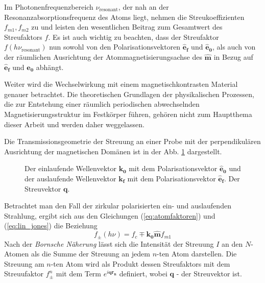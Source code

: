 \noindent
Im Photonenfrequenzbereich $\nu_\text{resonant}$, der nah an der Resonanzabsorptionsfrequenz des Atoms liegt, nehmen die Streukoeffizienten $f_{m1}, f_{m2}$ zu und leisten den wesentlichen Beitrag zum Gesamtwert des Streufaktors $f$. Es ist auch wichtig zu beachten, dass der Streufaktor $f(h\nu_\text{resonant})$ nun sowohl von den Polarisationsvektoren $\mathbf{\hat{e}_f}$ und $\mathbf{\hat{e}_0}$, als auch von der räumlichen Ausrichtung der Atommagnetisierungsachse des  $\mathbf{\hat{m}}$ in Bezug auf $\mathbf{\hat{e}_f}$ und $\mathbf{\hat{e}_0}$ abhängt.


\noindent
Weiter wird die Wechselwirkung mit einem magnetischkontrasten Material genauer betrachtet. Die theoretischen Grundlagen der physikalischen Prozessen, die zur Entstehung einer räumlich periodischen abwechselnden Magnetisierungsstruktur im Festkörper führen, gehören nicht zum Hauptthema dieser Arbeit und werden daher weggelassen.  

\noindent
Die Transmissionsgeometrie der Streuung an einer Probe mit der perpendikulären Ausrichtung der magnetischen Domänen ist in der Abb. \ref{fig:transmission_geometrie} dargestellt.
\begin{figure}[ht]
    \centering
    
    \caption{Der einlaufende Wellenvektor $\mathbf{k_0}$ mit dem Polarisationsvektor $\mathbf{\hat{e}_0}$ und der auslaufende Wellenvektor $\mathbf{k_f}$ mit dem Polarisationsvektor $\mathbf{\hat{e}_f}$. Der Streuvektor $\mathbf{q}$.}
    \label{fig:transmission_geometrie}
\end{figure}

\noindent
Betrachtet man den Fall der zirkular polarisierten ein- und auslaufenden Strahlung, ergibt sich aus den Gleichungen (\ref{eq:atomfaktoren}) und (\ref{eq:lin_jones}) die Beziehung
\begin{equation}
    f_{\pm}(h\nu)=f_{c}\mp \mathbf{k_0}\mathbf{\hat{m}} f_{m1}
    \label{eq:faktor_zirc}
\end{equation}
Nach der \emph{Bornsche Näherung} lässt sich die Intensität der Streuung $I$ an den $N$-Atomen als die Summe der Streuung an jedem $n$-ten Atom darstellen. Die Streuung am $n$-ten Atom wird  als Produkt dessen Streufaktors mit dem Streuufaktor $f_{\pm}^n$ mit dem Term $e^{i\mathbf{qr_n}}$ definiert, wobei $\mathbf{q}$ - der Streuvektor ist.

